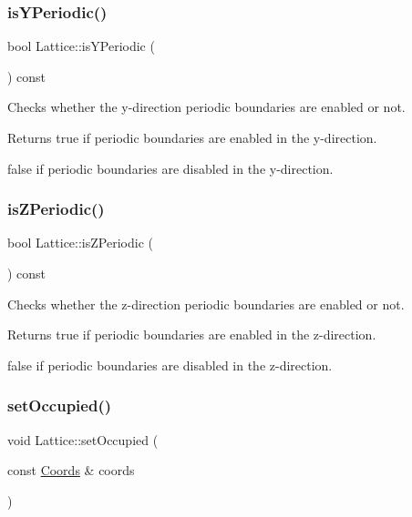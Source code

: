 \subsubsection{\texorpdfstring{is\+Y\+Periodic()}{isYPeriodic()}}
{\footnotesize\ttfamily bool Lattice\+::is\+Y\+Periodic (\begin{DoxyParamCaption}{ }\end{DoxyParamCaption}) const}



Checks whether the y-\/direction periodic boundaries are enabled or not. 

\begin{DoxyReturn}{Returns}
true if periodic boundaries are enabled in the y-\/direction. 

false if periodic boundaries are disabled in the y-\/direction. 
\end{DoxyReturn}
\mbox{\label{class_lattice_ad7dd1b12a253e506aba5cedb57bf86ea}} 
\subsubsection{\texorpdfstring{is\+Z\+Periodic()}{isZPeriodic()}}
{\footnotesize\ttfamily bool Lattice\+::is\+Z\+Periodic (\begin{DoxyParamCaption}{ }\end{DoxyParamCaption}) const}



Checks whether the z-\/direction periodic boundaries are enabled or not. 

\begin{DoxyReturn}{Returns}
true if periodic boundaries are enabled in the z-\/direction. 

false if periodic boundaries are disabled in the z-\/direction. 
\end{DoxyReturn}
\mbox{\label{class_lattice_a515b8bc548ef4a87c3495a7352a60399}} 
\subsubsection{\texorpdfstring{set\+Occupied()}{setOccupied()}}
{\footnotesize\ttfamily void Lattice\+::set\+Occupied (\begin{DoxyParamCaption}\item[{const \hyperlink{struct_coords}{Coords} \&}]{coords }\end{DoxyParamCaption})}



